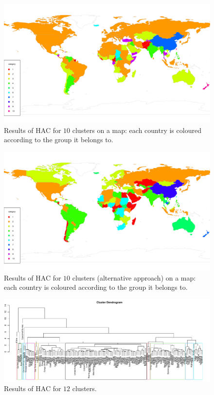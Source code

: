 \documentclass[a4paper,12pt]{article}
\numberwithin{equation}{section}
\begin{document}
\begin{figure}[t!]
\begin{minipage}[t]{0.98\textwidth}
\includegraphics[width=\textwidth]{plots/choropleth_10}
\caption{Results of HAC for $10$ clusters on a map: each country is coloured according to the group it belongs to.}\label{fig:map_10cl}
\end{minipage}
\end{figure}

\begin{figure}[t!]
\begin{minipage}[t]{0.98\textwidth}
\includegraphics[width=\textwidth]{plots/choropleth_alt_10}
\caption{Results of HAC for $10$ clusters (alternative approach) on a map: each country is coloured according to the group it belongs to.}
\end{minipage}
\end{figure}


\newpage 
\FloatBarrier
\begin{figure}
\includegraphics[width=\textwidth]{plots/dendrogram_12}
\caption{Results of HAC for $12$ clusters.}
\end{figure}
\end{document}
